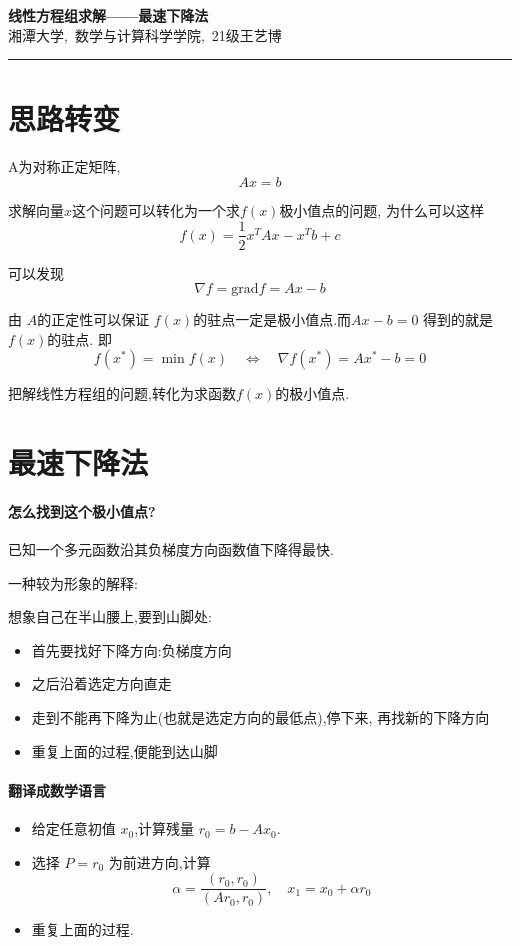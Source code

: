 \documentclass{xtupaper}
\begin{document}
\begin{center}
\LARGE
  \textbf{线性方程组求解——最速下降法}\\
  \vspace{0.5em}
  \large
湘潭大学,\ 数学与计算科学学院,\ 21级王艺博
  \end{center}
\rule[0.1\baselineskip]{\textwidth}{0.5pt}

\section{思路转变}
A为对称正定矩阵,$$Ax=b$$

求解向量$x$这个问题可以转化为一个求$f(x)$极小值点的问题, 为什么可以这样
$$f(x) = \frac{1}{2}x^TAx-x^Tb+c$$

可以发现 $$\nabla f=\mathrm{grad}f=Ax-b$$

由 $A$的正定性可以保证 $f(x)$的驻点一定是极小值点.而$Ax-b=0$ 得到的就是$f(x)$的驻点.
即
$$f(x^{*})=\min f(x)\quad\Leftrightarrow\quad\nabla f(x^{*})=Ax^{*}-b=0$$

把解线性方程组的问题,转化为求函数$f(x)$的极小值点.
\section{最速下降法}
\paragraph{怎么找到这个极小值点?}
已知一个多元函数沿其负梯度方向函数值下降得最快.

\noindent 一种较为形象的解释:

想象自己在半山腰上,要到山脚处:
\begin{itemize}
  \item 首先要找好下降方向:负梯度方向
  \item 之后沿着选定方向直走
  \item 走到不能再下降为止(也就是选定方向的最低点),停下来, 再找新的下降方向
  \item 重复上面的过程,便能到达山脚
\end{itemize}

\paragraph{翻译成数学语言}

\begin{itemize}
\item 给定任意初值 $x_0$,计算残量 $r_0=b-Ax_0$.
\item 选择 $P=r_0$ 为前进方向,计算
$$\alpha=\frac{\left(r_0,r_0\right)}{\left(Ar_0,r_0\right)},\quad x_1 = x_0 + \alpha r_0$$ 
\item 重复上面的过程.
\end{itemize}
\end{document}
